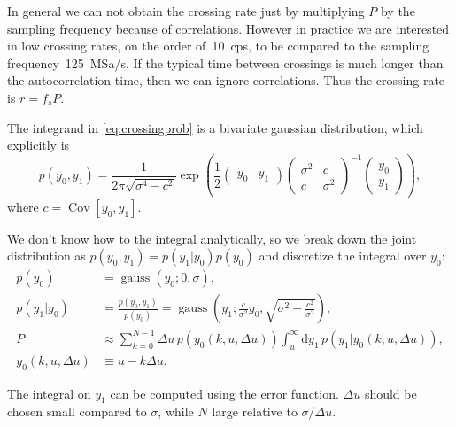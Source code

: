 In general we can not obtain the crossing rate just by multiplying $P$ by the
sampling frequency because of correlations. However in practice we are
interested in low crossing rates, on the order of~\SI{10}{cps}, to be compared
to the sampling frequency~\SI{125}{MSa/s}. If the typical time between
crossings is much longer than the autocorrelation time, then we can ignore
correlations. Thus the crossing rate is $r = f_s P$.


The integrand in \autoref{eq:crossingprob} is a bivariate gaussian
distribution, which explicitly is
%
\begin{equation}
    p(y_0,y_1) =
    \frac 1 {2\pi \sqrt{\sigma^4 - c^2}}
    \exp \left(
    \frac 1 2
    \begin{pmatrix}
        y_0 & y_1
    \end{pmatrix}
    \begin{pmatrix}
        \sigma^2 & c \\
        c & \sigma^2
    \end{pmatrix}^{-1}
    \begin{pmatrix}
        y_0 \\ y_1
    \end{pmatrix}
    \right),
\end{equation}
%
where $c = \operatorname{Cov}[y_0, y_1]$.

We don't know how to the integral analytically, so we break down the joint
distribution as $p(y_0,y_1) = p(y_1|y_0) p(y_0)$ and discretize the integral
over $y_0$:
%
\begin{align}
    p(y_0) &= \operatorname{gauss}(y_0; 0, \sigma), \\
    p(y_1|y_0) &= \frac {p(y_0, y_1)} {p(y_0)}
    = \operatorname{gauss} \left(
        y_1; \frac c {\sigma^2} y_0, \sqrt{\sigma^2 - \frac {c^2} {\sigma^2}}
    \right), \\
    P &\approx
    \sum_{k=0}^{N-1} \Delta u\, p(y_0(k,u,\Delta u))
    \int_u^\infty \mathrm d y_1\, p(y_1|y_0(k,u,\Delta u)), \label{eq:rdisc} \\
    y_0(k,u,\Delta u) &\equiv u - k \Delta u.
\end{align}

The integral on $y_1$ can be computed using the error function. $\Delta u$
should be chosen small compared to $\sigma$, while $N$ large relative to
$\sigma / \Delta u$.


